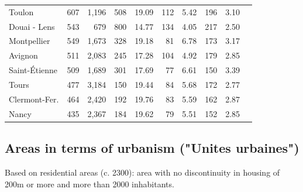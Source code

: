 \documentclass[11pt]{article}
\begin{document}
\begin{table}[H]
\begin{tabular}{llrrrrrrrr}
          Toulon &        607 &      1,196 &          508 &      19.09 &        112 &       5.42 &        196 &        3.10 \\
    Douai - Lens &        543 &        679 &          800 &      14.77 &        134 &       4.05 &        217 &        2.50 \\
     Montpellier &        549 &      1,673 &          328 &      19.18 &         81 &       6.78 &        173 &        3.17 \\
         Avignon &        511 &      2,083 &          245 &      17.28 &        104 &       4.92 &        179 &        2.85 \\
   Saint-Étienne &        509 &      1,689 &          301 &      17.69 &         77 &       6.61 &        150 &        3.39 \\
           Tours &        477 &      3,184 &          150 &      19.44 &         84 &       5.68 &        172 &        2.77 \\
   Clermont-Fer. &        464 &      2,420 &          192 &      19.76 &         83 &       5.59 &        162 &        2.87 \\
           Nancy &        435 &      2,367 &          184 &      19.62 &         79 &       5.51 &        152 &        2.85 \\
\bottomrule
\end{tabular}

\end{table}

\subsection{Areas in terms of urbanism ("Unites urbaines")}

Based on residential areas (c. 2300): area with no discontinuity in housing of 200m or more and more than 2000 inhabitants.
\end{document}
